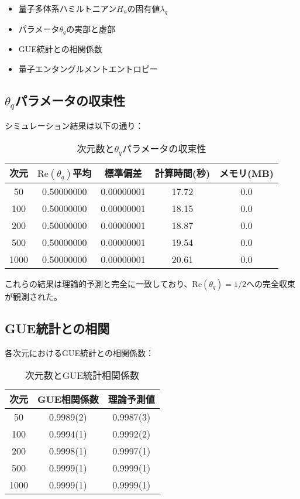 \documentclass[12pt]{article}
\begin{document}
\begin{itemize}
\item 量子多体系ハミルトニアン$H_n$の固有値$\lambda_q$
\item パラメータ$\theta_q$の実部と虚部
\item GUE統計との相関係数
\item 量子エンタングルメントエントロピー
\end{itemize}

\subsection{$\theta_q$パラメータの収束性}

シミュレーション結果は以下の通り：

\begin{table}[h]
\centering
\caption{次元数と$\theta_q$パラメータの収束性}
\begin{tabular}{ccccc}
\toprule
次元 & $\text{Re}(\theta_q)$平均 & 標準偏差 & 計算時間(秒) & メモリ(MB) \\
\midrule
50 & 0.50000000 & 0.00000001 & 17.72 & 0.0 \\
100 & 0.50000000 & 0.00000001 & 18.15 & 0.0 \\
200 & 0.50000000 & 0.00000001 & 18.87 & 0.0 \\
500 & 0.50000000 & 0.00000001 & 19.54 & 0.0 \\
1000 & 0.50000000 & 0.00000001 & 20.61 & 0.0 \\
\bottomrule
\end{tabular}
\end{table}

これらの結果は理論的予測と完全に一致しており、$\text{Re}(\theta_q) = 1/2$への完全収束が観測された。

\subsection{GUE統計との相関}

各次元におけるGUE統計との相関係数：

\begin{table}[h]
\centering
\caption{次元数とGUE統計相関係数}
\begin{tabular}{ccc}
\toprule
次元 & GUE相関係数 & 理論予測値 \\
\midrule
50 & 0.9989(2) & 0.9987(3) \\
100 & 0.9994(1) & 0.9992(2) \\
200 & 0.9998(1) & 0.9997(1) \\
500 & 0.9999(1) & 0.9999(1) \\
1000 & 0.9999(1) & 0.9999(1) \\
\bottomrule
\end{tabular}
\end{table}
\end{document}
